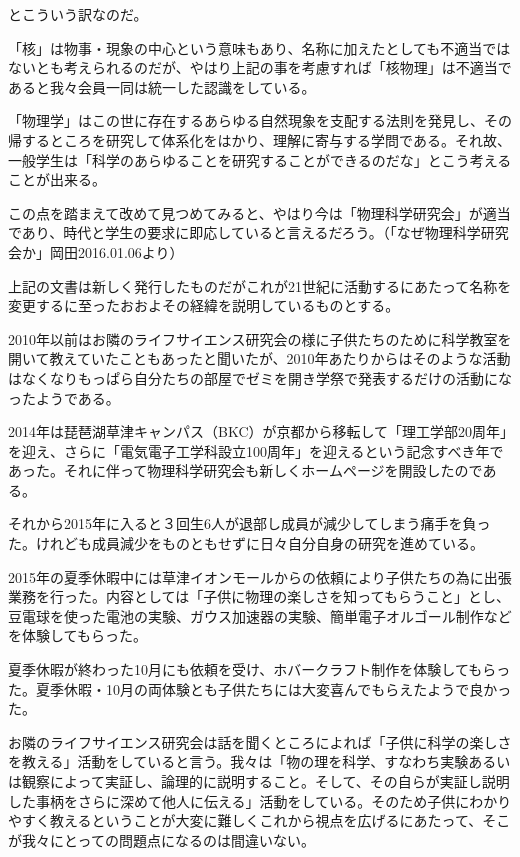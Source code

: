 \documentclass[10pt,b5paper,papersize]{jsbook}
\begin{document}
とこういう訳なのだ。\par
「核」は物事・現象の中心という意味もあり、名称に加えたとしても不適当ではないとも考えられるのだが、やはり上記の事を考慮すれば「核物理」は不適当であると我々会員一同は統一した認識をしている。\par
「物理学」はこの世に存在するあらゆる自然現象を支配する法則を発見し、その帰するところを研究して体系化をはかり、理解に寄与する学問である。それ故、一般学生は「科学のあらゆることを研究することができるのだな」とこう考えることが出来る。\par
この点を踏まえて改めて見つめてみると、やはり今は「物理科学研究会」が適当であり、時代と学生の要求に即応していると言えるだろう。（「なぜ物理科学研究会か」岡田2016.01.06より）\par
上記の文書は新しく発行したものだがこれが21世紀に活動するにあたって名称を変更するに至ったおおよその経緯を説明しているものとする。\par
2010年以前はお隣のライフサイエンス研究会の様に子供たちのために科学教室を開いて教えていたこともあったと聞いたが、2010年あたりからはそのような活動はなくなりもっぱら自分たちの部屋でゼミを開き学祭で発表するだけの活動になったようである。\par
2014年は琵琶湖草津キャンパス（BKC）が京都から移転して「理工学部20周年」を迎え、さらに「電気電子工学科設立100周年」を迎えるという記念すべき年であった。それに伴って物理科学研究会も新しくホームページを開設したのである。\par
それから2015年に入ると３回生6人が退部し成員が減少してしまう痛手を負った。けれども成員減少をものともせずに日々自分自身の研究を進めている。\par
2015年の夏季休暇中には草津イオンモールからの依頼により子供たちの為に出張業務を行った。内容としては「子供に物理の楽しさを知ってもらうこと」とし、豆電球を使った電池の実験、ガウス加速器の実験、簡単電子オルゴール制作などを体験してもらった。\par
夏季休暇が終わった10月にも依頼を受け、ホバークラフト制作を体験してもらった。夏季休暇・10月の両体験とも子供たちには大変喜んでもらえたようで良かった。\par
お隣のライフサイエンス研究会は話を聞くところによれば「子供に科学の楽しさを教える」活動をしていると言う。我々は「物の理を科学、すなわち実験あるいは観察によって実証し、論理的に説明すること。そして、その自らが実証し説明した事柄をさらに深めて他人に伝える」活動をしている。そのため子供にわかりやすく教えるということが大変に難しくこれから視点を広げるにあたって、そこが我々にとっての問題点になるのは間違いない。\par
\end{document}
